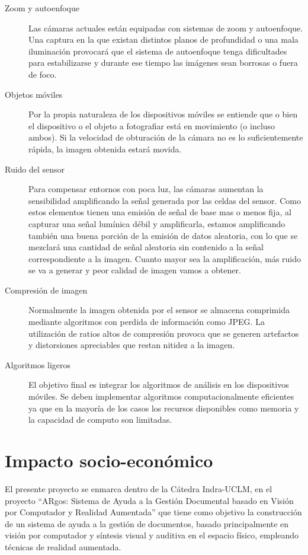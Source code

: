 \begin{description}
\item[Zoom y autoenfoque] Las cámaras actuales están equipadas con sistemas de zoom y autoenfoque. Una captura en la que existan distintos planos de profundidad o una mala iluminación provocará que el sistema de autoenfoque tenga dificultades para estabilizarse y durante ese tiempo las imágenes sean borrosas o fuera de foco.
\item[Objetos móviles] Por la propia naturaleza de los dispositivos móviles se entiende que o bien el dispositivo o el objeto a fotografiar está en movimiento (o incluso ambos). Si la velocidad de obturación de la cámara no es lo suficientemente rápida, la imagen obtenida estará movida.
\item[Ruido del sensor] Para compensar entornos con poca luz, las cámaras aumentan la sensibilidad amplificando la señal generada por las celdas del sensor. Como estos elementos tienen una emisión de señal de base mas o menos fija, al capturar una señal lumínica débil y amplificarla, estamos amplificando también una buena porción de la emisión de datos aleatoria, con lo que se mezclará una cantidad de señal aleatoria sin contenido a la señal correspondiente a la imagen. Cuanto mayor sea la amplificación, más ruido se va a generar y peor calidad de imagen vamos a obtener. 
\item[Compresión de imagen] Normalmente la imagen obtenida por el sensor se almacena comprimida mediante algoritmos con perdida de información como JPEG. La utilización de ratios altos de compresión provoca que se generen artefactos y distorsiones apreciables que restan nitidez a la imagen.
\item[Algoritmos ligeros] El objetivo final es integrar los algoritmos de análisis en los dispositivos móviles. Se deben implementar algoritmos computacionalmente eficientes ya que en la mayoría de los casos los recursos disponibles como memoria  y la capacidad de computo son limitadas.
\end{description}


\section{Impacto socio-económico}

El presente proyecto se enmarca dentro de la Cátedra Indra-UCLM, en el proyecto “ARgos: Sistema de Ayuda a la Gestión Documental basado en Visión por Computador y Realidad Aumentada” que tiene como objetivo la construcción de un sistema de ayuda a la gestión de documentos, basado principalmente en visión por computador y síntesis visual y auditiva en el espacio físico, empleando técnicas de realidad aumentada.  

